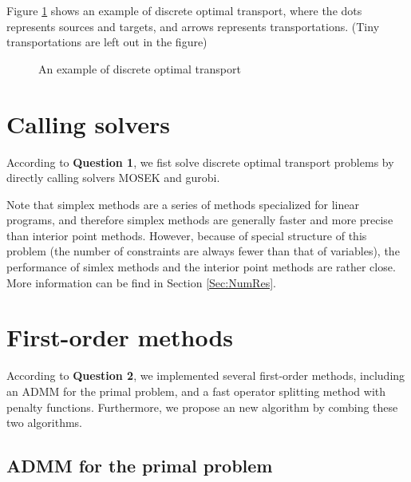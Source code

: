 \documentclass[english]{pkupaper}
\begin{document}
Figure \ref{Fig:EgDisOT} shows an example of discrete optimal transport, where the dots represents sources and targets, and arrows represents transportations. (Tiny transportations are left out in the figure)

\begin{figure}
\centering \scalebox{0.65}{}
\caption{An example of discrete optimal transport} \label{Fig:EgDisOT}
\end{figure}

\section{Calling solvers}

According to \textbf{Question 1}, we fist solve discrete optimal transport problems by directly calling solvers MOSEK and gurobi.

Note that simplex methods are a series of methods specialized for linear programs, and therefore simplex methods are generally faster and more precise than interior point methods. However, because of special structure of this problem (the number of constraints are always fewer than that of variables), the performance of simlex methods and the interior point methods are rather close. More information can be find in Section \ref{Sec:NumRes}.

\section{First-order methods} \label{Sec:FOM}

According to \textbf{Question 2}, we implemented several first-order methods, including an ADMM for the primal problem, and a fast operator splitting method with penalty functions. Furthermore, we propose an new algorithm by combing these two algorithms.

\subsection{ADMM for the primal problem}
\end{document}
